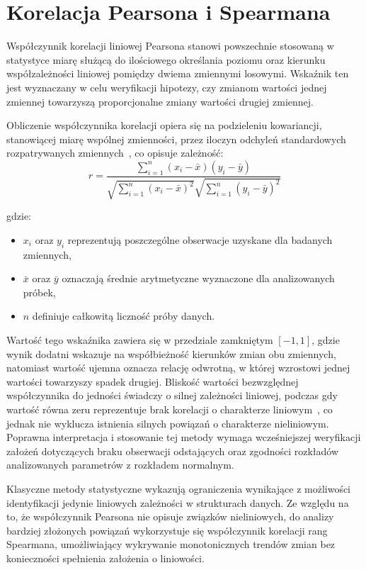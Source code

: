 \section{Korelacja Pearsona i Spearmana}
Współczynnik korelacji liniowej Pearsona stanowi powszechnie stosowaną w statystyce miarę służącą do ilościowego określania poziomu oraz kierunku współzależności liniowej pomiędzy dwiema zmiennymi losowymi. Wskaźnik ten jest wyznaczany w celu weryfikacji hipotezy, czy zmianom wartości jednej zmiennej towarzyszą proporcjonalne zmiany wartości drugiej zmiennej.
 
Obliczenie współczynnika korelacji opiera się na podzieleniu kowariancji, stanowiącej miarę wspólnej zmienności, przez iloczyn odchyleń standardowych rozpatrywanych zmiennych~\cite{korelacjaPearsona1, korelacjaPearsona2}, co opisuje zależność:
\begin{equation}
r = \frac{\sum_{i=1}^{n} (x_i - \bar{x})(y_i - \bar{y})}{\sqrt{\sum_{i=1}^{n} (x_i - \bar{x})^2} \sqrt{\sum_{i=1}^{n} (y_i - \bar{y})^2}}
\label{eq:korelacja_pearsona}
\end{equation} 
 
gdzie:
\begin{itemize}
    \item $x_i$ oraz $y_i$ reprezentują poszczególne obserwacje uzyskane dla badanych zmiennych,
    \item $\bar{x}$ oraz $\bar{y}$ oznaczają średnie arytmetyczne wyznaczone dla analizowanych próbek,
    \item $n$ definiuje całkowitą liczność próby danych.
\end{itemize}
 
Wartość tego wskaźnika zawiera się w przedziale zamkniętym $[-1, 1]$, gdzie wynik dodatni wskazuje na współbieżność kierunków zmian obu zmiennych, natomiast wartość ujemna oznacza relację odwrotną, w której wzrostowi jednej wartości towarzyszy spadek drugiej. Bliskość wartości bezwzględnej współczynnika do jedności świadczy o silnej zależności liniowej, podczas gdy wartość równa zeru reprezentuje brak korelacji o charakterze liniowym~\cite{korelacjaPearsona3, korelacjaPearsona4}, co jednak nie wyklucza istnienia silnych powiązań o charakterze nieliniowym. Poprawna interpretacja i stosowanie tej metody wymaga wcześniejszej weryfikacji założeń dotyczących braku obserwacji odstających oraz zgodności rozkładów analizowanych parametrów z rozkładem normalnym.
 
Klasyczne metody statystyczne wykazują ograniczenia wynikające z możliwości identyfikacji jedynie liniowych zależności w strukturach danych. Ze względu na to, że współczynnik Pearsona nie opisuje związków nieliniowych, do analizy bardziej złożonych powiązań wykorzystuje się współczynnik korelacji rang Spearmana, umożliwiający wykrywanie monotonicznych trendów zmian bez konieczności spełnienia założenia o liniowości.
 
